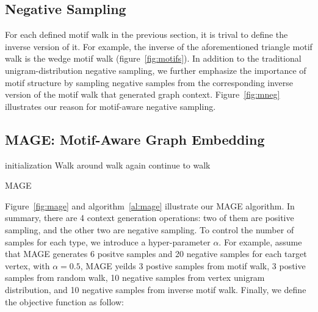 \documentclass[letterpaper]{article}
\begin{document}
        \subsection{Negative Sampling}

            For each defined motif walk in the previous section, it is trival to define the inverse version
            of it. For example, the inverse of the aforementioned triangle motif walk is the wedge motif
            walk (figure~\ref{fig:motifs}). In addition to the traditional unigram-distribution negative
            sampling, we further emphasize the importance of motif structure by sampling negative samples
            from the corresponding inverse version of the motif walk that generated graph context. 
            Figure~\ref{fig:mneg} illustrates our reason for motif-aware negative sampling.


        \subsection{MAGE: Motif-Aware Graph Embedding}

            \begin{algorithm}
                \DontPrintSemicolon
                initialization\;
                 {
                    Walk around\;
                     {
                        walk again\;
                    } {
                        continue to walk\;
                    }
                }
                \caption{MAGE}
                \label{al:mage}
            \end{algorithm}

            Figure~\ref{fig:mage} and algorithm~\ref{al:mage} illustrate our MAGE algorithm. In summary, 
            there are 4 context generation operations: two of them are positive sampling, and the other
            two are negative sampling. To control the number of samples for each type, we introduce a 
            hyper-parameter $\alpha$. For example, assume that MAGE generates 6 positve samples and 
            20 negative samples for each target vertex, with $\alpha=0.5$, MAGE yeilds 3 postive samples 
            from motif walk, 3 postive samples from random walk, 10 negative samples from vertex unigram
            distribution, and 10 negative samples from inverse motif walk.  Finally, we define the 
            objective function as follow:
\end{document}
